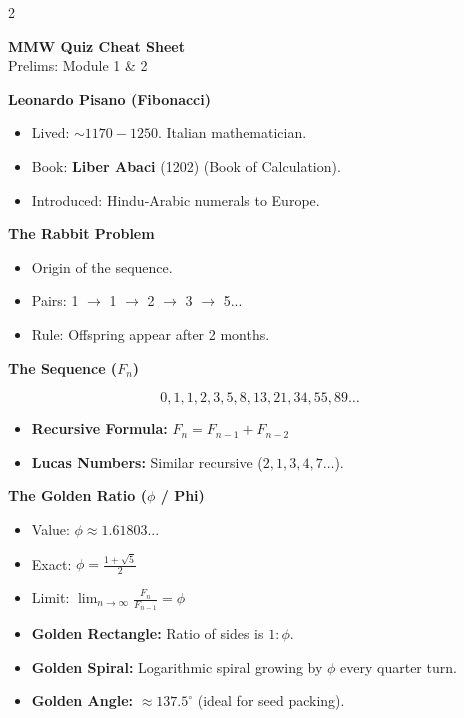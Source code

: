 \documentclass[11pt,letterpaper]{article}
\newcommand{\mysection}[1]{%
        \vspace{-0.3em}
        \colorbox{sectioncolor}{\makebox[\linewidth][l]{\bfseries\color{white}#1}}%
        \vspace{0.3em}
    }
\newcommand{\mysubsection}[1]{%
        \vspace{-0.2em}
        {\bfseries\color{sectioncolor}#1}%
        \vspace{0.1em}
    }
\begin{document}
    \raggedright
    \footnotesize
    \begin{multicols*}{2}

    \begin{center}
        \Large{\textbf{\color{sectioncolor}MMW Quiz Cheat Sheet}} \\
        \small{Prelims: Module 1 \& 2}
    \end{center}

    \mysection{1. Fibonacci Sequence}

    \mysubsection{Leonardo Pisano (Fibonacci)}
    \begin{itemize}[leftmargin=*, noitemsep, topsep=0pt]
        \item Lived: $\sim1170 - 1250$. Italian mathematician.
        \item Book: \textbf{Liber Abaci} (1202) (Book of Calculation).
        \item Introduced: Hindu-Arabic numerals to Europe.
    \end{itemize}

    \mysubsection{The Rabbit Problem}
    \begin{itemize}[leftmargin=*, noitemsep, topsep=0pt]
        \item Origin of the sequence.
        \item Pairs: 1 $\to$ 1 $\to$ 2 $\to$ 3 $\to$ 5...
        \item Rule: Offspring appear after 2 months. 
    \end{itemize}

    \mysubsection{The Sequence ($F_n$)}
    $$0, 1, 1, 2, 3, 5, 8, 13, 21, 34, 55, 89 \dots$$
    \begin{itemize}[leftmargin=*, noitemsep, topsep=0pt]
        \item \textbf{Recursive Formula:} $F_n = F_{n-1} + F_{n-2}$
        \item \textbf{Lucas Numbers:} Similar recursive ($2, 1, 3, 4, 7 \dots$).
    \end{itemize}

    \mysubsection{The Golden Ratio ($\phi$ / Phi)}
    \begin{itemize}[leftmargin=*, noitemsep, topsep=0pt]
        \item Value: $\phi \approx \mathbf{1.61803...}$
        \item Exact: $\phi = \frac{1 + \sqrt{5}}{2}$
        \item Limit: $\lim_{n \to \infty} \frac{F_{n}}{F_{n-1}} = \phi$
        \item \textbf{Golden Rectangle:} Ratio of sides is $1:\phi$.
        \item \textbf{Golden Spiral:} Logarithmic spiral growing by $\phi$ every quarter turn.
        \item \textbf{Golden Angle:} $\approx 137.5^\circ$ (ideal for seed packing).
    \end{itemize}


\end{multicols*}
\end{document}
